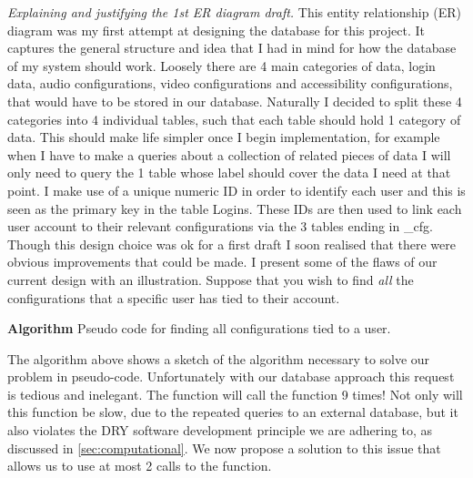\textit{Explaining and justifying the 1st ER diagram draft.}
This entity relationship (ER) diagram was my first attempt at
designing the database for this project. It captures the 
general structure and idea that I had in mind for how the
database of my system should work. Loosely there are 4 main 
categories of data, login data, audio configurations,
video configurations and accessibility configurations, that
would have to be stored in our database. Naturally I decided 
to split these 4 categories into 4 individual tables, such 
that each table should hold 1 category of data. This should 
make life simpler once I begin implementation, for example 
when I have to make a queries about a collection of related
pieces of data I will only need to query the 1 table whose 
label should cover the data I need at that point. I make use 
of a unique numeric ID in order to identify each user and this
is seen as the primary key in the table {\sffamily Logins}.
These IDs are then used to link each user account to their 
relevant configurations via the 3 tables ending in 
{\sffamily \_cfg}. Though this design choice was ok for a 
first draft I soon realised that there were obvious
improvements that could be made. I present some of the flaws
of our current design with an illustration. Suppose that you 
wish to find \emph{all} the configurations that a specific 
user has tied to their account.

\begin{algorithm}
\caption*{\textbf{Algorithm} Pseudo code for finding all 
configurations tied to a user.}
\label{alg:long}
\sffamily

\begin{algorithmic}[1]
     
    \State{}
    
    \State{\ldots}
    \State{}

  \EndFunction
\end{algorithmic}

\end{algorithm}

\mdseries

The algorithm above shows a sketch of the algorithm
necessary to solve our problem in pseudo-code. Unfortunately
with our database approach this request is tedious and
inelegant. The function will call the 
function 9 times! Not only will this function be slow, due to
the repeated queries to an external database, but it
also violates the DRY software development principle we are
adhering to, as discussed in \ref{sec:computational}. We now 
propose a solution to this issue that allows us to use at most
2 calls to the  function.

